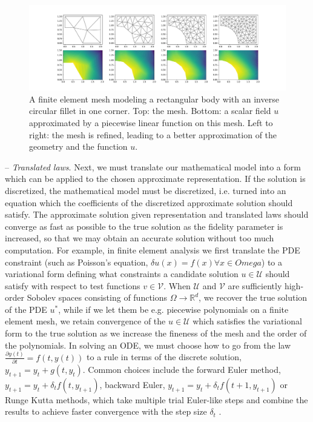 \documentclass{puthesis}
\begin{document}
\begin{figure}[t]
  \centering
\includegraphics[width=1\textwidth]{intro_figures/mesh_refinement.pdf}
\caption{\small A finite element mesh modeling a rectangular body with an inverse
circular fillet in one corner. Top: the mesh. Bottom: a scalar field $u$ approximated
by a piecewise linear function on this mesh. Left to right: the mesh is refined, leading
to a better approximation of the geometry and the function $u$.}%
\label{Fig:mesh_refinement}%
\end{figure}

-- \emph{Translated laws}. Next, we must translate our mathematical model into a form
which can be applied to the chosen approximate representation.
If the solution is
discretized, the mathematical model must be discretized, i.e. turned into an equation
which the coefficients of the discretized approximate solution should satisfy.
The approximate solution given representation and translated laws should
converge as fast as possible to the true solution as the fidelity parameter is increased,
so that we may obtain an accurate solution without too much computation.
For example, in finite element analysis we first translate the PDE constraint
(such as Poisson's equation, $\delta u(x) = f(x) \forall x \in Omega$) to a
variational form defining what constraints a candidate solution $u \in \mathcal{U}$
should satisfy with respect to test functions $v \in \mathcal{V}$. When $\mathcal{U}$
and $\mathcal{V}$ are sufficiently high-order Sobolev spaces consisting of functions
$\Omega \to \mathbb{R}^d$, we recover the true solution of the PDE $u^*$,
while if we let them be e.g. piecewise polynomials on a
finite element mesh, we retain convergence of the $u \in \mathcal{U}$ which satisfies
the variational form to the true solution as we increase the fineness of the mesh and
the order of the polynomials.
In solving an ODE, we must choose how to go from the law
$\frac{\partial y(t)}{\partial t} = f(t, y(t))$ to a rule in terms of the discrete solution,
$y_{t+1} = y_t + g(t, y_t)$.
Common choices include the forward Euler method,
$y_{t+1} = y_t + \delta_t f(t, y_{t+1})$,
backward Euler, $y_{t+1} = y_t + \delta_t f(t+1, y_{t+1})$ or Runge Kutta methods,
which take multiple trial Euler-like steps and combine the results to achieve
faster convergence with the step size $\delta_t$ \citep{suli2003introduction}.
\end{document}
